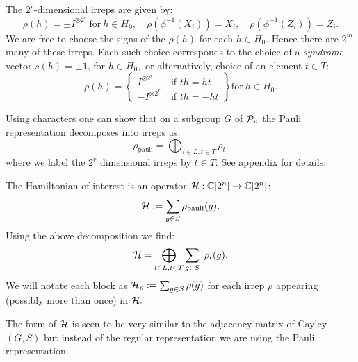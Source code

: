 \documentclass[12pt,notitlepage,longbibliography,nofootinbib,tightenlines]{revtex4}
\begin{document}
The $2^r$-dimensional irreps are given by:
$$
    \rho(h) = \pm I^{\otimes 2^r}\ \mbox{for}\ h\in H_0,
    \quad \rho(\phi^{-1}(X_i)) = X_i,\quad \rho(\phi^{-1}(Z_i)) = Z_i.
$$
We are free to choose the signs of the $\rho(h)$ for each $h\in H_0.$
Hence there are $2^m$ many of these irreps.
Each such choice corresponds to the choice of a {\it syndrome} vector $s(h)=\pm 1$, for $h \in H_0,$
or alternatively, choice of an element $t\in T:$
$$
    \rho(h) = \left\{ \begin{array}{ll}
 I^{\otimes 2^r}\ &\mbox{if $th=ht$}\\
 -I^{\otimes 2^r}\ &\mbox{if $th=-ht$}\end{array} \right\}\mbox{for}\ h\in H_0.
$$


Using characters one can show that
on a subgroup $G$ of $\mathcal{P}_n$ the
Pauli representation decomposes into irreps as:
$$
    \rho_{\mathrm{pauli}} = \bigoplus_{l\in L, t\in T} \rho_t.
$$
where we label the $2^r$ dimensional irreps by $t\in T.$
See appendix for details.

The Hamiltonian of interest is 
an operator $\mathcal{H}:\mathbb{C}[2^n]\to\mathbb{C}[2^n]$:
$$ \mathcal{H} := \sum_{g\in S} \rho_{\mathrm{pauli}}(g).$$
Using the above decomposition we find:
$$
    \mathcal{H} = \bigoplus_{l\in L, t\in T} \sum_{g\in S}\ \rho_t(g).
$$
We will notate each block as
$\mathcal{H}_\rho := \sum_{g\in S}\rho(g)$
for each irrep $\rho$ appearing (possibly more than once)
in $\mathcal{H}.$

The form of $\mathcal{H}$ is seen to be very similar
to the adjacency matrix of Cayley$(G, S)$ but
instead of the regular representation we are
using the Pauli representation.
\end{document}
